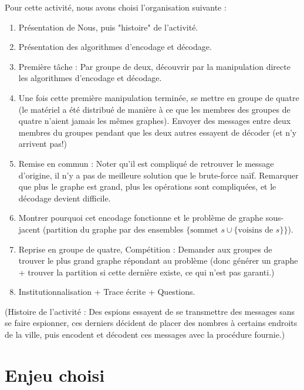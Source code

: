 \documentclass{article}
\begin{document}
\bigskip

Pour cette activité, nous avons choisi l'organisation suivante : 
\begin{enumerate}
\item Présentation de Nous, puis "histoire" de l'activité.
\item Présentation des algorithmes d'encodage et décodage.
\item Première tâche : Par groupe de deux, découvrir par la manipulation directe les algorithmes d'encodage et décodage.

\item Une fois cette première manipulation terminée, se mettre en groupe de quatre (le matériel a été distribué de manière à ce que les membres des groupes de quatre n'aient jamais les mêmes graphes). Envoyer des messages entre deux membres du groupes pendant que les deux autres essayent de décoder (et n'y arrivent pas!)

\item Remise en commun : Noter qu'il est compliqué de retrouver le message d'origine, il n'y a pas de meilleure solution que le brute-force naïf. Remarquer que plus le graphe est grand, plus les opérations sont compliquées, et le décodage devient difficile.

\item Montrer pourquoi cet encodage fonctionne et le problème de graphe sous-jacent (partition du graphe par des ensembles $\{\text{sommet } s \cup \{\text{voisins de } s\}\}$).


\item Reprise en groupe de quatre, Compétition : Demander aux groupes de trouver le plus grand graphe répondant au problème (donc générer un graphe + trouver la partition si cette dernière existe, ce qui n'est pas garanti.)

\item Institutionnalisation + Trace écrite + Questions. 
\end{enumerate}

\bigskip

(Histoire de l'activité : Des espions essayent de se transmettre des messages sans se faire espionner, ces derniers décident de placer des nombres à certains endroits de la ville, puis encodent et décodent ces messages avec la procédure fournie.)


\newpage

\section{Enjeu choisi}
\label{sec:enjeu}
\end{document}
